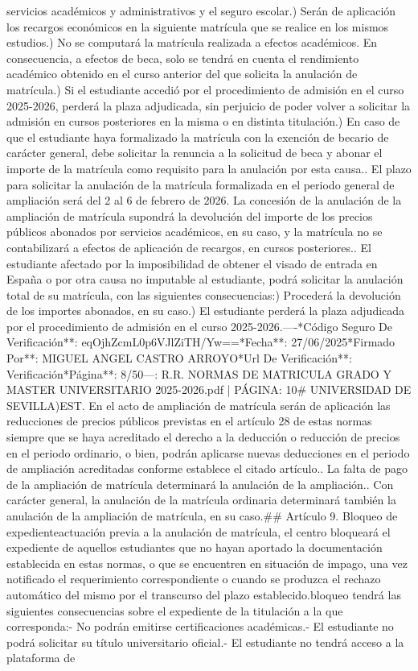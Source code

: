 \documentclass{article}
\begin{document}
\begin{itemize}
{{{servicios académicos y administrativos y el seguro escolar.\n\nb) Serán de aplicación los recargos económicos en la siguiente matrícula que se realice en los mismos estudios.\n\nc) No se computará la matrícula realizada a efectos académicos. En consecuencia, a efectos de beca, solo se tendrá en cuenta el rendimiento académico obtenido en el curso anterior del que solicita la anulación de matrícula.\n\nd) Si el estudiante accedió por el procedimiento de admisión en el curso 2025-2026, perderá la plaza adjudicada, sin perjuicio de poder volver a solicitar la admisión en cursos posteriores en la misma o en distinta titulación.\n\ne) En caso de que el estudiante haya formalizado la matrícula con la exención de becario de carácter general, debe solicitar la renuncia a la solicitud de beca y abonar el importe de la matrícula como requisito para la anulación por esta causa.\n{}. El plazo para solicitar la anulación de la matrícula formalizada en el periodo general de ampliación será del 2 al 6 de febrero de 2026. La concesión de la anulación de la ampliación de matrícula supondrá la devolución del importe de los precios públicos abonados por servicios académicos, en su caso, y la matrícula no se contabilizará a efectos de aplicación de recargos, en cursos posteriores.\n{}. El estudiante afectado por la imposibilidad de obtener el visado de entrada en España o por otra causa no imputable al estudiante, podrá solicitar la anulación total de su matrícula, con las siguientes consecuencias:\n\na) Procederá la devolución de los importes abonados, en su caso.\n\nb) El estudiante perderá la plaza adjudicada por el procedimiento de admisión en el curso 2025-2026.\n\n----\n\n**Código Seguro De Verificación**: eqOjhZcmL0p6VJlZiTH/Yw==\n**Fecha**: 27/06/2025\n**Firmado Por**: MIGUEL ANGEL CASTRO ARROYO\n**Url De Verificación**: Verificación\n**Página**: 8/50\n\n---\n\nFUENTE: R.R. NORMAS DE MATRICULA GRADO Y MASTER UNIVERSITARIO 2025-2026.pdf | PÁGINA: 10\n# UNIVERSIDAD DE SEVILLA\n\nC)EST\n{}. En el acto de ampliación de matrícula serán de aplicación las reducciones de precios públicos previstas en el artículo 28 de estas normas siempre que se haya acreditado el derecho a la deducción o reducción de precios en el periodo ordinario, o bien, podrán aplicarse nuevas deducciones en el periodo de ampliación acreditadas conforme establece el citado artículo.\n{}. La falta de pago de la ampliación de matrícula determinará la anulación de la ampliación.\n{}. Con carácter general, la anulación de la matrícula ordinaria determinará también la anulación de la ampliación de matrícula, en su caso.\n\n## Artículo 9. Bloqueo de expediente\n\nComo actuación previa a la anulación de matrícula, el centro bloqueará el expediente de aquellos estudiantes que no hayan aportado la documentación establecida en estas normas, o que se encuentren en situación de impago, una vez notificado el requerimiento correspondiente o cuando se produzca el rechazo automático del mismo por el transcurso del plazo establecido.\n\nEste bloqueo tendrá las siguientes consecuencias sobre el expediente de la titulación a la que corresponda:\n\n- No podrán emitirse certificaciones académicas.\n- El estudiante no podrá solicitar su título universitario oficial.\n- El estudiante no tendrá acceso a la plataforma de }}}
\end{itemize}
\end{document}
